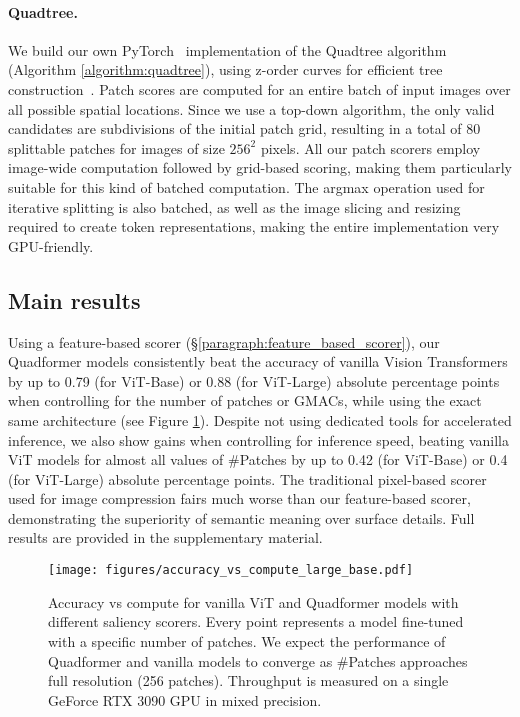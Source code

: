 \paragraph{Quadtree.} \label{paragraph:impl_quadtree}
We build our own PyTorch~\cite{Paszke_PyTorch_An_Imperative_2019} implementation of the Quadtree algorithm (Algorithm \ref{algorithm:quadtree}), using z-order curves for efficient tree construction~\cite{Warren1993APH}. Patch scores are computed for an entire batch of input images over all possible spatial locations. Since we use a top-down algorithm, the only valid candidates are subdivisions of the initial patch grid, resulting in a total of 80 splittable patches for images of size $256^2$ pixels. All our patch scorers employ image-wide computation followed by grid-based scoring, making them particularly suitable for this kind of batched computation. The argmax operation used for iterative splitting is also batched, as well as the image slicing and resizing required to create token representations, making the entire implementation very GPU-friendly.

\subsection{Main results}
Using a feature-based scorer (\S\ref{paragraph:feature_based_scorer}), our Quadformer models consistently beat the accuracy of vanilla Vision Transformers by up to 0.79 (for ViT-Base) or 0.88 (for ViT-Large) absolute percentage points when controlling for the number of patches or GMACs, while using the exact same architecture (see Figure \ref{figure:accuracy_vs_compute_main_results}). Despite not using dedicated tools for accelerated inference, we also show gains when controlling for inference speed, beating vanilla ViT models for almost all values of \#Patches by up to 0.42 (for ViT-Base) or 0.4 (for ViT-Large) absolute percentage points. The traditional pixel-based scorer used for image compression fairs much worse than our feature-based scorer, demonstrating the superiority of semantic meaning over surface details. Full results are provided in the supplementary material.

\begin{figure}[t!]
  \centering
  \hspace*{-0.035\linewidth}
  \texttt{[image: figures/accuracy\_vs\_compute\_large\_base.pdf]}
  \caption{Accuracy vs compute for vanilla ViT and Quadformer models with different saliency scorers. Every point represents a model fine-tuned with a specific number of patches. We expect the performance of Quadformer and vanilla models to converge as \#Patches approaches full resolution (256 patches). Throughput is measured on a single GeForce RTX 3090 GPU in mixed precision.}
  \label{figure:accuracy_vs_compute_main_results}
\end{figure}


